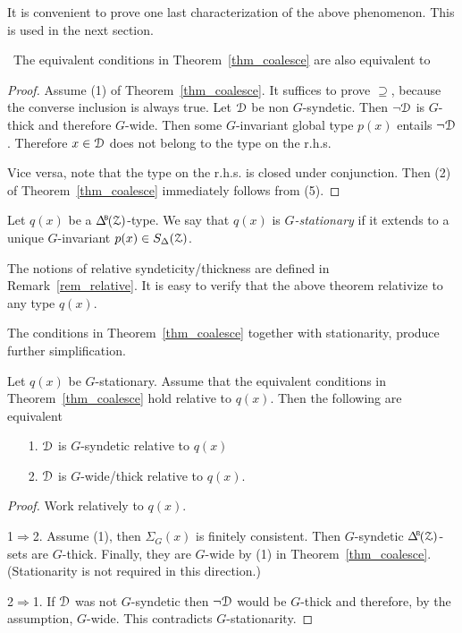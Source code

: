 It is convenient to prove one last characterization of the above phenomenon.
This is used in the next section. 

\begin{proposition}\label{prop_coalese}\ 
  The equivalent conditions in Theorem~\ref{thm_coalesce} are also equivalent to\smallskip

\end{proposition}

\begin{proof} 
  Assume (1) of Theorem~\ref{thm_coalesce}.
  It suffices to prove $\supseteq$, because the converse inclusion is always true. 
  Let $\EuScript D$ be non $G$-syndetic.
  Then $\neg\EuScript D$ is $G$-thick and therefore $G$-wide.
  Then some $G$-invariant global type $p(x)$ entails $\neg\EuScript D$.
  Therefore $x\in\EuScript D$ does not belong to the type on the r.h.s.
  
  Vice versa, note that the type on the r.h.s. is closed under conjunction.
  Then (2) of Theorem~\ref{thm_coalesce} immediately follows from (5).
\end{proof}


Let $q(x)$ be a $\BDelta(\Z)$-type.
We say that $q(x)$ is \emph{$G$-stationary\/} if it extends to a unique $G$-invariant $p(x)\in S_\Delta(\EuScript Z)$.

The notions of relative syndeticity/thickness are defined in Remark~\ref{rem_relative}.
It is easy to verify that the above theorem relativize to any type $q(x)$.

The conditions in Theorem~\ref{thm_coalesce} together with stationarity, produce further simplification.

\begin{fact}\label{fact_stationarity}
  Let $q(x)$ be $G$-stationary.
  Assume that the equivalent conditions in Theorem~\ref{thm_coalesce} hold relative to $q(x)$.
  Then the following are equivalent
  \begin{itemize}
    \item [1.] $\EuScript D$ is $G$-syndetic relative to $q(x)$
    \item [2.] $\EuScript D$ is $G$-wide/thick relative to $q(x)$.
  \end{itemize}\smallskip
\end{fact}

\begin{proof}
  Work relatively to $q(x)$.

  1$\Rightarrow$2.
  Assume (1), then $\Sigma_G(x)$ is finitely consistent.
  Then $G$-syndetic $\BDelta({\Z})$-sets are $G$-thick.
  Finally, they are $G$-wide by (1) in Theorem~\ref{thm_coalesce}.
  (Stationarity is not required in this direction.)

  2$\Rightarrow$1.
  If $\EuScript D$ was not $G$-syndetic then $\neg\EuScript D$ would be $G$-thick and therefore, by the assumption, $G$-wide.
  This contradicts $G$-stationarity.
\end{proof}

